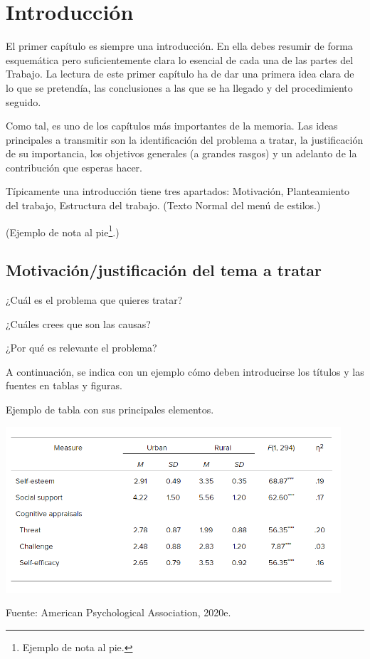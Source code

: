 \chapter{Introducción}

El primer capítulo es siempre una introducción. En ella debes resumir de forma esquemática pero suficientemente clara lo esencial de cada una de las partes del Trabajo. La lectura de este primer capítulo ha de dar una primera idea clara de lo que se pretendía, las conclusiones a las que se ha llegado y del procedimiento seguido.

Como tal, es uno de los capítulos más importantes de la memoria. Las ideas principales a transmitir son la identificación del problema a tratar, la justificación de su importancia, los objetivos generales (a grandes rasgos) y un adelanto de la contribución que esperas hacer.

Típicamente una introducción tiene tres apartados: Motivación, Planteamiento del trabajo, Estructura del trabajo. (Texto Normal del menú de estilos.)

(Ejemplo de nota al pie\footnote{Ejemplo de nota al pie.}.)

\section{Motivación/justificación del tema a tratar}

¿Cuál es el problema que quieres tratar?

¿Cuáles crees que son las causas?

¿Por qué es relevante el problema?

A continuación, se indica con un ejemplo cómo deben introducirse los títulos y las fuentes en tablas y figuras.

\begin{table}[t]
	\begin{center}
	\caption{Ejemplo de tabla con sus principales elementos.}
	\label{tab:tab-1}
	\includegraphics[width=4.90737in,height=2.42708in]{tabla}

	\small Fuente: American Psychological Association, 2020e.
	\end{center}
\end{table}

